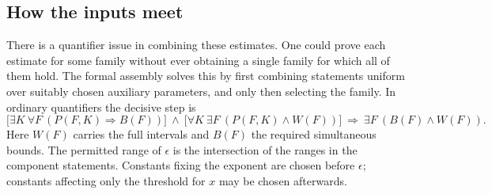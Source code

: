 \documentclass[11pt,a4paper]{article}
\theoremstyle{definition}\newtheorem{arithinput}[theorem]{Arithmetic input}
\begin{document}
\subsection{How the inputs meet}
There is a quantifier issue in combining these estimates. One could prove each estimate for some family without ever obtaining a single family for which all of them hold. The formal assembly solves this by first combining statements uniform over suitably chosen auxiliary parameters, and only then selecting the family. In ordinary quantifiers the decisive step is
\[
 \big[\exists K\ \forall F\ (P(F,K)\Rightarrow B(F))\big]
 \ \wedge\ \big[\forall K\ \exists F\ (P(F,K)\wedge W(F))\big]
 \ \Longrightarrow\ \exists F\ (B(F)\wedge W(F)).
\]
Here $W(F)$ carries the full intervals and $B(F)$ the required simultaneous bounds. The permitted range of $\epsilon$ is the intersection of the ranges in the component statements. Constants fixing the exponent are chosen before $\epsilon$; constants affecting only the threshold for $x$ may be chosen afterwards.
\end{document}

